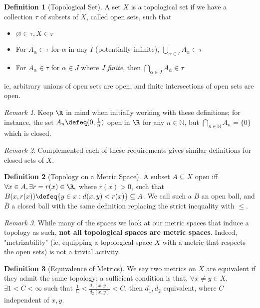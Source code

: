 \documentclass[12pt, oneside]{article}
\theoremstyle{definition}
\newtheorem{defn}{Definition}
\theoremstyle{plain}
\theoremstyle{remark}
\newtheorem{remark}{Remark}
\begin{document}
\begin{defn}[Topological Set]
  A set $X$ is a topological set if we have a collection $\tau$ of subsets of $X$, called open sets, such that \begin{itemize}
    \item $\varnothing \in \tau, X \in \tau$
    \item For $A_\alpha \in \tau$ for $\alpha$ in any $I$ (potentially infinite), $\bigcup_{\alpha \in I} A_\alpha \in \tau$
    \item For $A_\alpha \in \tau$ for $\alpha \in J$ where \emph{J finite}, then $\bigcap_{\alpha \in J} A_\alpha \in \tau$
  \end{itemize}
  ie, arbitrary unions of open sets are open, and finite intersections of open sets are open.
\end{defn}

\begin{remark}
  Keep $\R$ in mind when initially working with these definitions; for instance, the set $A_n \defeq (0, \frac{1}{n})$ open in $\R$ for any $n \in \mathbb{N}$, but $\bigcap_{n \in \mathbb{N}} A_n = \{0\}$ which is closed.
\end{remark}

\begin{remark}
  Complemented each of these requirements gives similar definitions for closed sets of $X$.
\end{remark}

\begin{defn}[Topology on a Metric Space]
  A subset $A \subseteq X$ open iff $\forall x \in A, \exists r = r(x) \in \R,$ where $r(x) > 0$, such that $B(x, r(x)) \defeq \{y \in x : d(x, y) < r(x)\} \subseteq A$. We call such a $B$ an open ball, and $\overline{B}$ a closed ball with the same definition replacing the strict inequality with $\leq$.
\end{defn}

\begin{remark}
  While many of the spaces we look at our metric spaces that induce a topology as such, \textbf{not all topological spaces are metric spaces}. Indeed, "metrizability" (ie, equipping a topological space $X$ with a metric that respects the open sets) is not a trivial activity.
\end{remark}


\begin{defn}[Equivalence of Metrics]
  We say two metrics on $X$ are equivalent if they admit the same topology; a sufficient condition is that, $\forall x \neq y \in X$, $\exists 1 < C < \infty$ such that $\frac{1}{C} < \frac{d_1(x,y)}{d_2(x,y)}< C$, then $d_1, d_2$ equivalent, where $C$ independent of $x,y$.
\end{defn}
\end{document}
